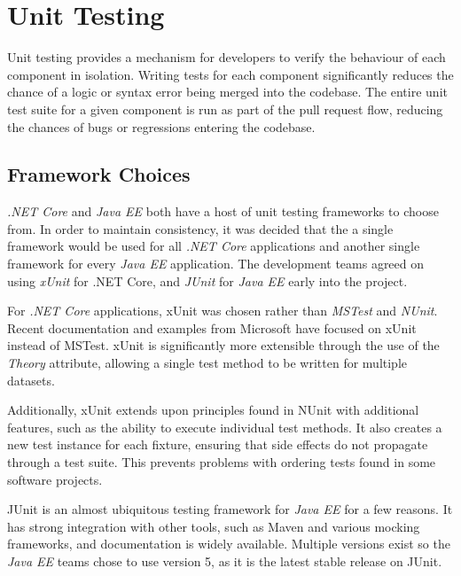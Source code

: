 \section{Unit Testing}
\par
Unit testing provides a mechanism for developers to verify the behaviour of each component in isolation. Writing tests for each component significantly reduces the chance of a logic or syntax error being merged into the codebase. The entire unit test suite for a given component is run as part of the pull request flow, reducing the chances of bugs or regressions entering the codebase.

\par
\subsection{Framework Choices}
\textit{.NET Core} and \textit{Java EE} both have a host of unit testing frameworks to choose from. In order to maintain consistency, it was decided that the a single framework would be used for all \textit{.NET Core} applications and another single framework for every \textit{Java EE} application. The development teams agreed on using \textit{xUnit}\cite{xUnit} for .NET Core, and \textit{JUnit}\cite{JUnit} for \textit{Java EE} early into the project.

\par
For \textit{.NET Core} applications, xUnit was chosen rather than \textit{MSTest} and \textit{NUnit}. Recent documentation and examples from Microsoft have focused on xUnit instead of MSTest. xUnit is significantly more extensible through the use of the \textit{Theory} attribute, allowing a single test method to be written for multiple datasets.

\par
Additionally, xUnit extends upon principles found in NUnit with additional features, such as the ability to execute individual test methods\cite{Nunit_XUnit_comparison}. It also creates a new test instance for each fixture, ensuring that side effects do not propagate through a test suite. This prevents problems with ordering tests found in some software projects.

\par
JUnit is an almost ubiquitous testing framework for \textit{Java EE} for a few reasons. It has strong integration with other tools, such as Maven and various mocking frameworks, and documentation is widely available. Multiple versions exist so the \textit{Java EE} teams chose to use version 5, as it is the latest stable release on JUnit.

